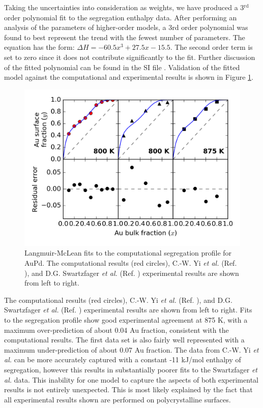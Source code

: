 \documentclass[12pt,oneside]{cmuthesis}
\begin{document}
Taking the uncertainties into consideration as weights, we have produced a 3\(^{\text{rd}}\) order polynomial fit to the segregation enthalpy data. After performing an analysis of the parameters of higher-order models, a 3rd order polynomial was found to best represent the trend with the fewest number of parameters. The equation has the form: \(\Delta H = -60.5x^3 + 27.5x - 15.5\). The second order term is set to zero since it does not contribute significantly to the fit. Further discussion of the fitted polynomial can be found in the SI file \cite{boes-2017-model-segreg}. Validation of the fitted model against the computational and experimental results is shown in Figure \ref{fig-fit-prediction}.

\begin{figure}[h]
\centering
\includegraphics[width=5.5in]{./images/fit-prediction.png}
\caption{\label{fig-fit-prediction}
Langmuir-McLean fits to the computational segregation profile for AuPd. The computational results (red circles), C.-W. Yi \emph{et al.} (Ref. ), and D.G. Swartzfager \emph{et al.} (Ref. ) experimental results are shown from left to right.}
\end{figure}

The computational results (red circles), C.-W. Yi \emph{et al.} (Ref. ), and D.G. Swartzfager \emph{et al.} (Ref. ) experimental results are shown from left to right. Fits to the segregation profile show good experimental agreement at 875 K, with a maximum over-prediction of about 0.04 Au fraction, consistent with the computational results. The first data set is also fairly well represented with a maximum under-prediction of about 0.07 Au fraction. The data from C.-W. Yi \emph{et al.} can be more accurately captured with a constant -11 kJ/mol enthalpy of segregation, however this results in substantially poorer fits to the Swartzfager \emph{et al.} data. This inability for one model to capture the aspects of both experimental results is not entirely unexpected. This is most likely explained by the fact that all experimental results shown are performed on polycrystalline surfaces.
\end{document}
